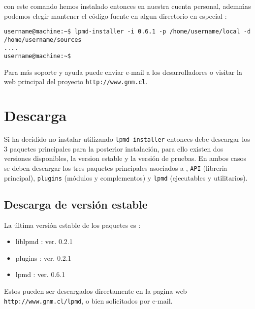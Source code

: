 con este comando hemos instalado entonces {\lpmd} en nuestra cuenta personal, adem\'mas podemos elegir mantener el c\'odigo fuente en algun directorio en especial :

\begin{verbatim}
username@machine:~$ lpmd-installer -i 0.6.1 -p /home/username/local -d /home/username/sources
....
username@machine:~$
\end{verbatim}

Para m\'as soporte y ayuda puede enviar e-mail a los desarrolladores o visitar la web principal del proyecto \verb|http://www.gnm.cl|.

\section{Descarga}

Si ha decidido no instalar {\lpmd} utilizando \verb|lpmd-installer| entonces debe descargar los 3 paquetes principales para la posterior instalaci\'on, para ello existen dos versiones disponibles, la version estable y la versi\'on de pruebas. En ambos casos se deben descargar los tres paquetes principales asociados a {\lpmd}, \verb|API| (libreria principal), \verb|plugins| (m\'odulos y complementos) y \verb|lpmd| (ejecutables y utilitarios).

\subsection{Descarga de versi\'on estable}

La \'ultima versi\'on estable de los paquetes es :

\begin{itemize}
 \item liblpmd : ver. 0.2.1
 \item plugins : ver. 0.2.1
 \item lpmd    : ver. 0.6.1
\end{itemize}


Estos pueden ser descargados directamente en la pagina web \texttt{http://www.gnm.cl/lpmd}, o bien solicitados por e-mail.

